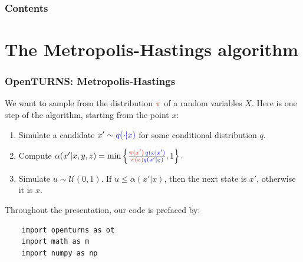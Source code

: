 \documentclass{beamer}
\newcommand{\target}[1]{\textcolor{red}{#1}}
\newcommand{\proposal}[1]{\textcolor{blue}{#1}}
\begin{document}
\begin{frame}
    \frametitle{Contents}
    \tableofcontents
    \end{frame}









\section{The Metropolis-Hastings algorithm}
\begin{frame}[containsverbatim]
    \frametitle{OpenTURNS: Metropolis-Hastings}
    \small
    We want to sample from the distribution $\target{\pi}$ of a random variables $X$.
    Here is one step of the algorithm, starting from the point $x$:

    \begin{enumerate}
    \item Simulate a candidate $x' \sim \proposal{q( \cdot | x)}$ for some conditional distribution $q$.
    \item Compute
    $
    \alpha(x' | x,y,z) = \min \left\{ \frac{\target{\pi(x')} \, \proposal{q(x | x')}}{\target{\pi(x)} \proposal{q(x' | x)}} , 1 \right\}.
    $
    \item Simulate $u \sim \mathcal{U}(0,1)$. If $u \leqslant \alpha(x'| x)$,
    then the next state is $x'$, otherwise it is $x$.
    \end{enumerate}

    Throughout the presentation, our code is prefaced by:

    \begin{lstlisting}
    import openturns as ot
    import math as m
    import numpy as np
    \end{lstlisting}
\end{frame}

\end{document}
